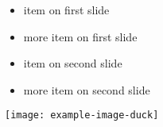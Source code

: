 \documentclass{beamer}
\begin{document}
\begin{frame}   

\begin{itemize}
    \item<only@1> item on first slide
    \item<only@1> more item on first slide
    \item<only@2> item on second slide
    \item<only@2> more item on second slide 
\end{itemize}

\texttt{[image: example-image-duck]}

\end{frame}
\end{document}
